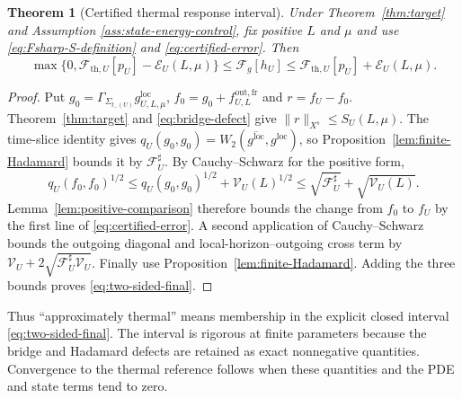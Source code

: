 \documentclass[11pt,a4paper]{article}
\newtheorem{theorem}{Theorem}[section]
\theoremstyle{definition}
\theoremstyle{remark}
\begin{document}
	\begin{theorem}[Certified thermal response interval]
		\label{thm:certified-response}
		Under Theorem~\ref{thm:target} and Assumption
		\ref{ass:state-energy-control}, fix positive $L$ and $\mu$ and use
		\eqref{eq:Fsharp-S-definition} and \eqref{eq:certified-error}.  Then
		\begin{equation}
			\max\{0,\mathcal F_{\mathrm{th},U}[p_U]-\mathcal E_U(L,\mu)\}
			\leq\mathcal F_g[h_U]
			\leq\mathcal F_{\mathrm{th},U}[p_U]+\mathcal E_U(L,\mu).
			\label{eq:two-sided-final}
		\end{equation}
	\end{theorem}
	
	\begin{proof}
		Put $g_0=\Gamma_{\Sigma_{t_-(U)}}g^{\mathrm{loc}}_{U,L,\mu}$,
		$f_0=g_0+f^{\mathrm{out,fr}}_{U,L}$ and $r=f_U-f_0$.
		Theorem~\ref{thm:target} and \eqref{eq:bridge-defect} give
		$\|r\|_{X^s}\leq S_U(L,\mu)$.
		The time-slice identity gives
		$q_U(g_0,g_0)=W_2(\overline{g^{\mathrm{loc}}},g^{\mathrm{loc}})$, so
		Proposition~\ref{lem:finite-Hadamard} bounds it by
		$\mathcal F_U^\sharp$.
		By Cauchy--Schwarz for the positive form,
		\begin{equation}
			q_U(f_0,f_0)^{1/2}
			\leq q_U(g_0,g_0)^{1/2}
			+\mathcal V_U(L)^{1/2}
			\leq\sqrt{\mathcal F_U^\sharp}+\sqrt{\mathcal V_U(L)}.
		\end{equation}
		Lemma~\ref{lem:positive-comparison} therefore bounds the change from $f_0$ to
		$f_U$ by the first line of \eqref{eq:certified-error}.  A second application of
		Cauchy--Schwarz bounds the outgoing diagonal and local-horizon--outgoing cross term
		by $\mathcal V_U+2\sqrt{\mathcal F_U^\sharp\mathcal V_U}$.  Finally use
		Proposition~\ref{lem:finite-Hadamard}.  Adding the three bounds proves
		\eqref{eq:two-sided-final}.
	\end{proof}
	
	Thus ``approximately thermal'' means membership in the explicit closed
	interval \eqref{eq:two-sided-final}.  The interval is rigorous at finite
	parameters because the bridge and Hadamard defects are retained as exact
	nonnegative quantities.  Convergence to the thermal reference follows when
	these quantities and the PDE and state terms tend to zero.
	
\end{document}
